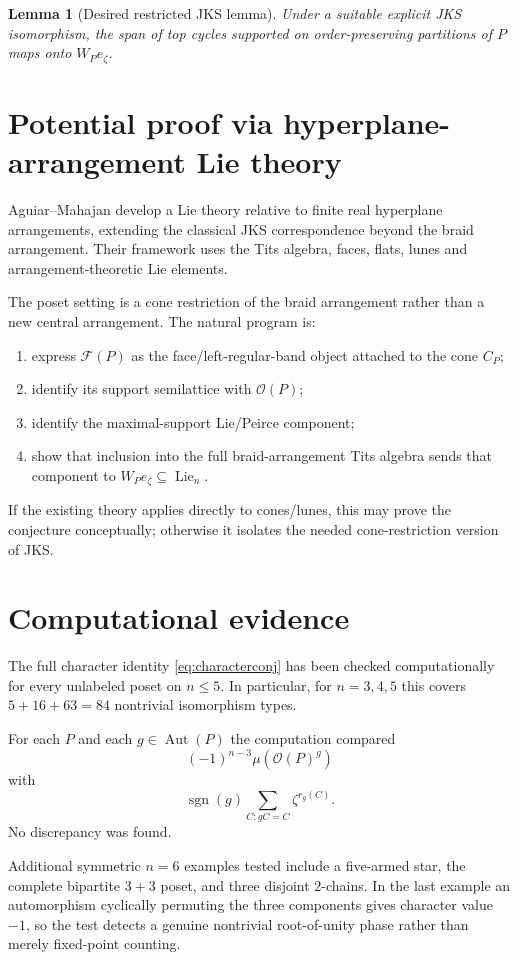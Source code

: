 \documentclass[11pt]{article}
\newtheorem{lemma}{Lemma}
\newcommand{\OP}{\mathcal O}
\newcommand{\Aut}{\operatorname{Aut}}
\newcommand{\Lie}{\operatorname{Lie}}
\newcommand{\sgn}{\operatorname{sgn}}
\begin{document}
\begin{lemma}[Desired restricted JKS lemma]
Under a suitable explicit JKS isomorphism, the span of top cycles supported
on order-preserving partitions of $P$ maps onto $W_Pe_\zeta$.
\end{lemma}

\section{Potential proof via hyperplane-arrangement Lie theory}
Aguiar--Mahajan develop a Lie theory relative to finite real hyperplane
arrangements, extending the classical JKS correspondence beyond the braid
arrangement. Their framework uses the Tits algebra, faces, flats, lunes and
arrangement-theoretic Lie elements.

The poset setting is a cone restriction of the braid arrangement rather
than a new central arrangement. The natural program is:
\begin{enumerate}[label=\arabic*.]
\item express $\mathcal F(P)$ as the face/left-regular-band object attached
to the cone $C_P$;
\item identify its support semilattice with $\OP(P)$;
\item identify the maximal-support Lie/Peirce component;
\item show that inclusion into the full braid-arrangement Tits algebra sends
that component to $W_Pe_\zeta\subseteq\Lie_n$.
\end{enumerate}
If the existing theory applies directly to cones/lunes, this may prove the
conjecture conceptually; otherwise it isolates the needed cone-restriction
version of JKS.

\section{Computational evidence}
The full character identity \eqref{eq:characterconj} has been checked
computationally for every unlabeled poset on $n\le5$. In particular, for
$n=3,4,5$ this covers $5+16+63=84$ nontrivial isomorphism types.

For each $P$ and each $g\in\Aut(P)$ the computation compared
\[
(-1)^{n-3}\mu(\OP(P)^g)
\]
with
\[
\sgn(g)\sum_{C:gC=C}\zeta^{r_g(C)}.
\]
No discrepancy was found.

Additional symmetric $n=6$ examples tested include a five-armed star, the
complete bipartite $3+3$ poset, and three disjoint $2$-chains. In the last
example an automorphism cyclically permuting the three components gives
character value $-1$, so the test detects a genuine nontrivial root-of-unity
phase rather than merely fixed-point counting.
\end{document}
